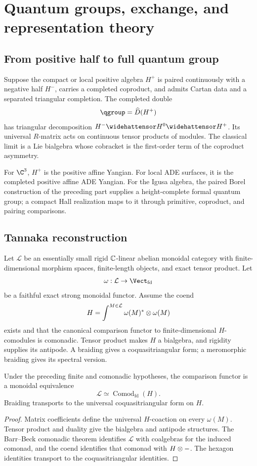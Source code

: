 \part{Quantum groups, exchange, and representation theory}

\chapter{From positive half to full quantum group}
Suppose the compact or local positive algebra $H^+$ is paired continuously with a negative half $H^-$, carries a completed coproduct, and admits Cartan data and a separated triangular completion. The completed double
\[
 \qgroup=\widehat D(H^+)
\]
has triangular decomposition $H^-\widehattensor H^0\widehattensor H^+$. Its universal $R$-matrix acts on continuous tensor products of modules. The classical limit is a Lie bialgebra whose cobracket is the first-order term of the coproduct asymmetry.

For $\C^3$, $H^+$ is the positive affine Yangian. For local ADE surfaces, it is the completed positive affine ADE Yangian. For the Igusa algebra, the paired Borel construction of the preceding part supplies a height-complete formal quantum group; a compact Hall realization maps to it through primitive, coproduct, and pairing comparisons.

\chapter{Tannaka reconstruction}
Let $\mathcal L$ be an essentially small rigid $\mathbb C$-linear abelian monoidal category with finite-dimensional morphism spaces, finite-length objects, and exact tensor product. Let
\[
 \omega:\mathcal L\to\Vect_{\mathrm{fd}}
\]
be a faithful exact strong monoidal functor. Assume the coend
\[
 H=\int^{M\in\mathcal L}\omega(M)^*\mathbin{\otimes}\omega(M)
\]
exists and that the canonical comparison functor to finite-dimensional $H$-comodules is comonadic. Tensor product makes $H$ a bialgebra, and rigidity supplies its antipode. A braiding gives a coquasitriangular form; a meromorphic braiding gives its spectral version.

\begin{theorem}
Under the preceding finite and comonadic hypotheses, the comparison functor is a monoidal equivalence
\[
 \mathcal L\simeq\operatorname{Comod}_{\mathrm{fd}}(H).
\]
Braiding transports to the universal coquasitriangular form on $H$.
\end{theorem}
\begin{proof}
Matrix coefficients define the universal $H$-coaction on every $\omega(M)$. Tensor product and duality give the bialgebra and antipode structures. The Barr--Beck comonadic theorem identifies $\mathcal L$ with coalgebras for the induced comonad, and the coend identifies that comonad with $H\mathbin{\otimes}-$. The hexagon identities transport to the coquasitriangular identities.
\end{proof}

